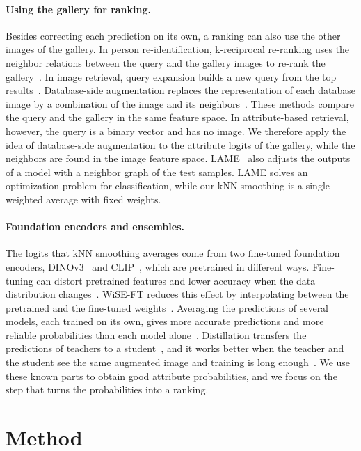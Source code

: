\documentclass[10pt,twocolumn,letterpaper]{article}
\begin{document}
\paragraph{Using the gallery for ranking.} Besides correcting each prediction on its own, a ranking can also use the other images of the gallery. In person re-identification, k-reciprocal re-ranking uses the neighbor relations between the query and the gallery images to re-rank the gallery~\cite{kreciprocal}. In image retrieval, query expansion builds a new query from the top results~\cite{chum07}. Database-side augmentation replaces the representation of each database image by a combination of the image and its neighbors~\cite{turcot,arandjelovic,gordo}. These methods compare the query and the gallery in the same feature space. In attribute-based retrieval, however, the query is a binary vector and has no image. We therefore apply the idea of database-side augmentation to the attribute logits of the gallery, while the neighbors are found in the image feature space. LAME~\cite{lame} also adjusts the outputs of a model with a neighbor graph of the test samples. LAME solves an optimization problem for classification, while our kNN smoothing is a single weighted average with fixed weights.

\paragraph{Foundation encoders and ensembles.} The logits that kNN smoothing averages come from two fine-tuned foundation encoders, DINOv3~\cite{dinov3} and CLIP~\cite{clip}, which are pretrained in different ways. Fine-tuning can distort pretrained features and lower accuracy when the data distribution changes~\cite{lpft}. WiSE-FT reduces this effect by interpolating between the pretrained and the fine-tuned weights~\cite{wiseft}. Averaging the predictions of several models, each trained on its own, gives more accurate predictions and more reliable probabilities than each model alone~\cite{deepens}. Distillation transfers the predictions of teachers to a student~\cite{hinton}, and it works better when the teacher and the student see the same augmented image and training is long enough~\cite{patient}. We use these known parts to obtain good attribute probabilities, and we focus on the step that turns the probabilities into a ranking.

\section{Method}
\label{sec:method}
\end{document}
